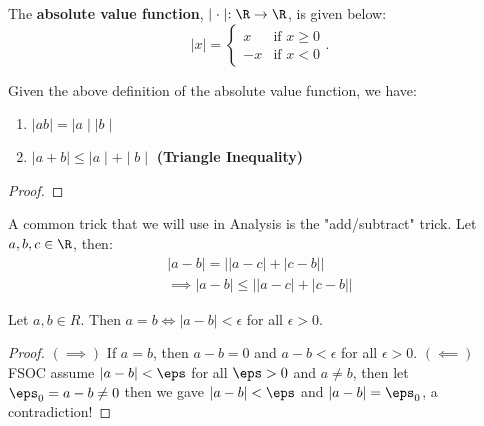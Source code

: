 \begin{eg}
	The \textbf{absolute value function}, $ \mid \cdot  \mid : \R \to \R$, is given below: 
	\[
		 \mid x \mid =
		\begin{cases}
			x & \text{if } x\ge 0	\\
			-x & \text{if } x <0
		\end{cases}
	.\] 
\end{eg}

\begin{theorem}
	Given the above definition of the absolute value function, we have:
	\begin{enumerate}
		\item  $ \mid ab \mid  =  \mid a \mid  \mid b \mid $
		\item $ \mid a + b \mid \le  \mid a \mid + \mid b \mid $ \textbf{ (Triangle Inequality)}
	\end{enumerate}
\end{theorem}

\begin{proof}
	
\end{proof}


\begin{note}
	A common trick that we will use in Analysis is the "add/subtract" trick. Let $a, b, c \in \R$, then: 
	\begin{align}
		\lvert a - b \rvert = \lvert \lvert a - c \rvert + \lvert c - b \rvert \rvert\\
		\implies \lvert a-b \rvert \le \lvert \lvert a - c \rvert + \lvert c - b \rvert \rvert
	\end{align}
\end{note}

\begin{theorem}
	Let $a, b \in R$. Then $a = b \iff \lvert a - b \rvert < \epsilon$ for all $\epsilon > 0$.
\end{theorem}

\begin{proof}
	$\left( \implies \right)$ If $a=b$, then $a-b=0$ and $a - b < \epsilon$ for all $\epsilon > 0$. 
	$\left( \impliedby \right) $ FSOC assume $\lvert a-b \rvert < \eps$ for all $\eps > 0 $ and $a \neq b$, then let $\eps_0 = a-b \neq 0$ then we gave $\lvert a-b \rvert < \eps$ and $\lvert a-b \rvert = \eps_0$, a contradiction! 
	
\end{proof}






